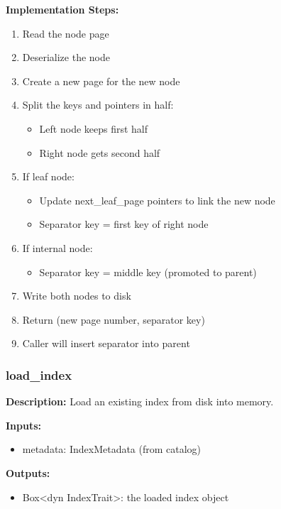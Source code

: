 \documentclass[11pt,a4paper]{article}
\begin{document}
\textbf{Implementation Steps:}
\begin{enumerate}
\item Read the node page
\item Deserialize the node
\item Create a new page for the new node
\item Split the keys and pointers in half:
    \begin{itemize}
    \item Left node keeps first half
    \item Right node gets second half
    \end{itemize}
\item If leaf node:
    \begin{itemize}
    \item Update next\_leaf\_page pointers to link the new node
    \item Separator key = first key of right node
    \end{itemize}
\item If internal node:
    \begin{itemize}
    \item Separator key = middle key (promoted to parent)
    \end{itemize}
\item Write both nodes to disk
\item Return (new page number, separator key)
\item Caller will insert separator into parent
\end{enumerate}

\subsubsection{load\_index}

\textbf{Description:} Load an existing index from disk into memory.

\textbf{Inputs:}
\begin{itemize}
\item metadata: IndexMetadata (from catalog)
\end{itemize}

\textbf{Outputs:}
\begin{itemize}
\item Box<dyn IndexTrait>: the loaded index object
\end{itemize}
\end{document}
